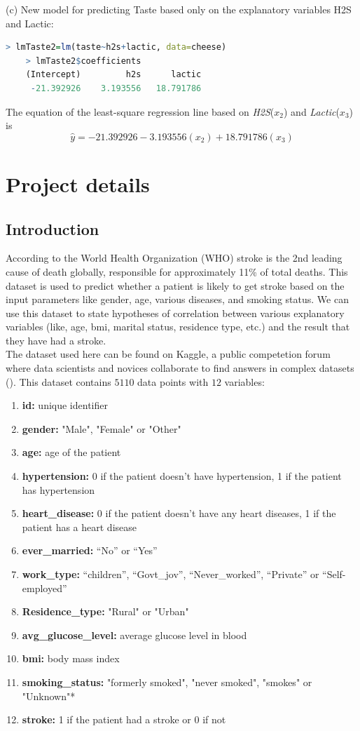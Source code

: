 \documentclass[boxes, qed]{homework}
\begin{document}
\begin{solution}
  (c) New model for predicting Taste based only on the
      explanatory variables H2S and Lactic:
  \begin{lstlisting}[backgroundcolor = \color{lightgray},language = R]
    > lmTaste2=lm(taste~h2s+lactic, data=cheese)
    > lmTaste2$coefficients
    (Intercept)         h2s      lactic 
     -21.392926    3.193556   18.791786 
  \end{lstlisting}
  The equation of the least-square regression line based on 
  \textit{H2S}($x_2$) and \textit{Lactic}($x_3$) is
  $$\hat{y}=-21.392926 - 3.193556(x_2) + 18.791786(x_3)$$
\end{solution}

\pagebreak

\section*{Project details}
\subsection*{Introduction}
According to the World Health Organization (WHO) stroke is the 2nd leading cause of death globally, 
responsible for approximately 11\% of total deaths. This dataset is used to predict whether a patient
is likely to get stroke based on the input parameters like gender, age, various diseases, and smoking 
status. We can use this dataset to state hypotheses of correlation between various explanatory
variables (like, age, bmi, marital status, residence type, etc.) and the result that they have had
a stroke.\\
The dataset used here can be found on Kaggle, a public competetion forum
where data scientists and novices collaborate to find answers in complex datasets
(\cite{kaggle}). This dataset contains $5110$ data points with $12$ variables:
\begin{enumerate}
  \item \textbf{id:} unique identifier
  \item \textbf{gender:} "Male", "Female" or "Other"
  \item \textbf{age:} age of the patient
  \item \textbf{hypertension:} 0 if the patient doesn't have hypertension, 1 if the patient has hypertension
  \item \textbf{heart\_disease:} 0 if the patient doesn't have any heart diseases, 1 if the patient has a heart disease
  \item \textbf{ever\_married:} ``No'' or ``Yes''
  \item \textbf{work\_type:} ``children'', ``Govt\_jov'', ``Never\_worked'', ``Private'' or ``Self-employed''
  \item \textbf{Residence\_type:} "Rural" or "Urban"
  \item \textbf{avg\_glucose\_level:} average glucose level in blood
  \item \textbf{bmi:} body mass index
  \item \textbf{smoking\_status:} "formerly smoked", "never smoked", "smokes" or "Unknown"*
  \item \textbf{stroke:} 1 if the patient had a stroke or 0 if not
\end{enumerate}
\end{document}
